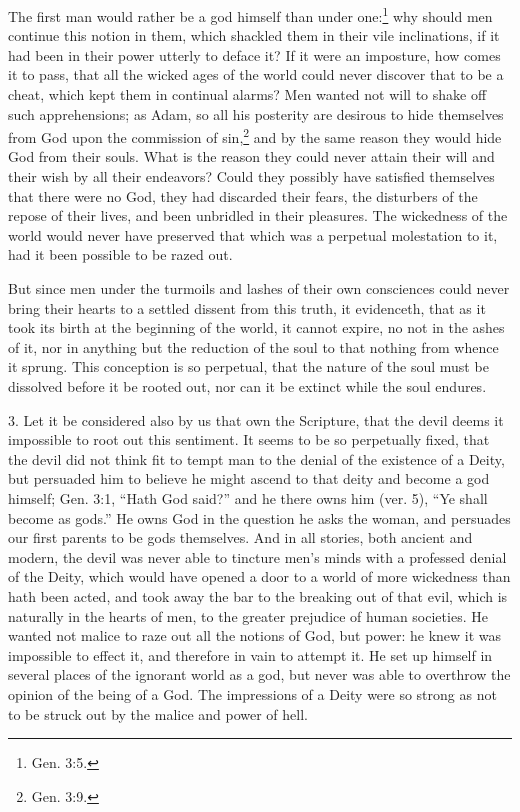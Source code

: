 \documentclass[a5paper]{book}
\begin{document}
The first man would rather be a god himself than under one:\footnote{Gen. 3:5.}
    why should men continue this notion in them, 
    which shackled them in their vile inclinations, 
    if it had been in their power utterly to deface it? 
If it were an imposture, how comes it to pass, 
    that all the wicked ages of the world could never 
    discover that to be a cheat,
    which kept them in continual alarms? 
Men wanted not will to shake off such apprehensions; 
    as Adam, so all his posterity are desirous 
    to hide themselves from God upon the commission of sin,\footnote{Gen. 3:9.}
    and by the same reason they would hide God from their souls. %
What is the reason they could never attain their will and their wish 
    by all their endeavors? 
Could they possibly have satisfied themselves 
    that there were no God, 
    they had discarded their fears, 
    the disturbers of the repose of their lives, 
    and been unbridled in their pleasures. 
The wickedness of the world would never have preserved 
    that which was a perpetual molestation to it, 
    had it been possible to be razed out.

But since men under the turmoils and lashes of their own consciences 
    could never bring their hearts to a settled dissent 
    from this truth, it evidenceth, 
    that as it took its birth at the beginning of the world, 
    it cannot expire, no not in the ashes of it, 
    nor in anything but the reduction of the soul 
    to that nothing from whence it sprung.
This conception is so perpetual, 
    that the nature of the soul must be dissolved before it be rooted out, 
    nor can it be extinct while the soul endures.

3. Let it be considered also by us that own the Scripture, 
    that the devil deems it impossible to root out this sentiment. 
It seems to be so perpetually fixed, 
    that the devil did not think fit to tempt man to 
    the denial of the existence of a Deity, 
    but persuaded him to believe he might ascend to that deity 
    and become a god himself; 
    Gen. 3:1, ``Hath God said?'' and he there owns him (ver. 5), 
    ``Ye shall become as gods.'' 
He owns God in the question he asks the woman,
    and persuades our first parents to be gods themselves. 
And in all stories, both ancient and modern, 
    the devil was never able to tincture men’s minds 
    with a professed denial of the Deity, 
    which would have opened a door to a world of more wickedness 
    than hath been acted,
    and took away the bar to the breaking out of that evil, 
    which is naturally in the hearts of men, 
    to the greater prejudice of human societies. 
He wanted not malice to raze out all the notions of God, but power: 
    he knew it was impossible to effect it, 
    and therefore in vain to attempt it. 
He set up himself in several places of the ignorant world as a god, 
    but never was able to overthrow the opinion of the being of a God. 
The impressions of a Deity were so strong as not to be struck out 
    by the malice and power of hell.
\end{document}

